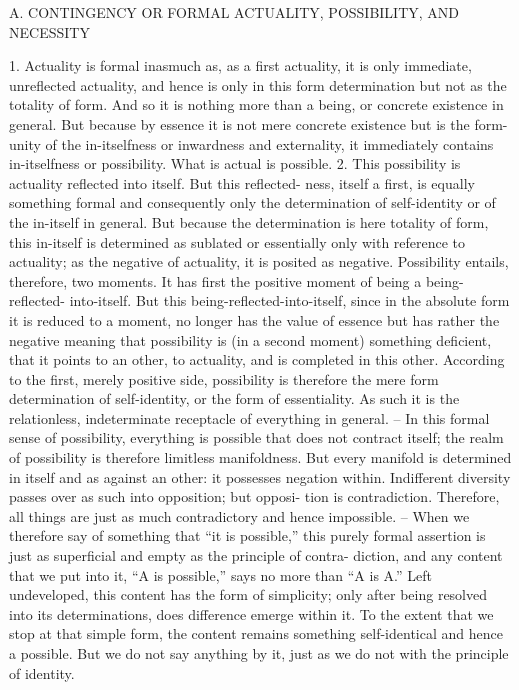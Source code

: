 A. CONTINGENCY OR FORMAL ACTUALITY, POSSIBILITY, AND NECESSITY

1. Actuality is formal inasmuch as, as a first actuality, it is only immediate,
unreflected actuality, and hence is only in this form determination but not
as the totality of form. And so it is nothing more than a being, or concrete
existence in general. But because by essence it is not mere concrete existence
but is the form-unity of the in-itselfness or inwardness and externality, it
immediately contains in-itselfness or possibility. What is actual is possible.
2. This possibility is actuality reflected into itself. But this reflected-
ness, itself a first, is equally something formal and consequently only the
determination of self-identity or of the in-itself in general.
But because the determination is here totality of form, this in-itself is
determined as sublated or essentially only with reference to actuality; as the
negative of actuality, it is posited as negative. Possibility entails, therefore,
two moments. It has first the positive moment of being a being-reflected-
into-itself. But this being-reflected-into-itself, since in the absolute form it
is reduced to a moment, no longer has the value of essence but has rather
the negative meaning that possibility is (in a second moment) something
deficient, that it points to an other, to actuality, and is completed in this
other.
According to the first, merely positive side, possibility is therefore the
mere form determination of self-identity, or the form of essentiality. As such
it is the relationless, indeterminate receptacle of everything in general. –
In this formal sense of possibility, everything is possible that does not contract
itself; the realm of possibility is therefore limitless manifoldness. But every
manifold is determined in itself and as against an other: it possesses negation
within. Indifferent diversity passes over as such into opposition; but opposi-
tion is contradiction. Therefore, all things are just as much contradictory
and hence impossible.
– When we therefore say of something that “it is possible,” this purely
formal assertion is just as superficial and empty as the principle of contra-
diction, and any content that we put into it, “A is possible,” says no more
than “A is A.” Left undeveloped, this content has the form of simplicity;
only after being resolved into its determinations, does difference emerge
within it. To the extent that we stop at that simple form, the content
remains something self-identical and hence a possible. But we do not say
anything by it, just as we do not with the principle of identity.

